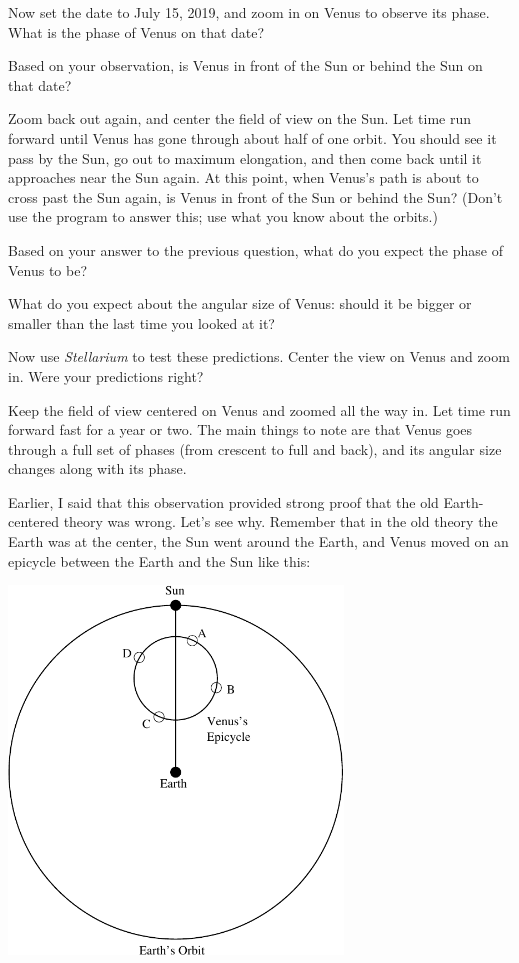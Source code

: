 \answerspace{ 0.7in}

\pagebreak[2]
Now set the date to July 15, 2019, and 
zoom in on Venus to observe its phase.  What is the phase of Venus on that date?

\answerspace{ 0.7in}

Based on your observation, is Venus in front of the Sun or behind the Sun
on that date?

\answerspace{ 0.7in}


Zoom back out again, and center the field of view on the Sun.  Let time
run forward until Venus has gone through about half of one orbit.  You
should see it pass by the Sun, go out to maximum elongation, and then come
back until it approaches near the Sun again.  At this point, when
Venus's path is about to cross past the Sun again, is Venus in front
of the Sun or behind the Sun?  (Don't use the program to answer this; 
use what you know about the orbits.)

\answerspace{ 0.7in}

Based on your answer to the previous question, what do you expect the 
phase of Venus to be?

\answerspace{ 0.7in}

What do you expect about the angular size of Venus: should it be bigger
or smaller than the last time you looked at it?

\answerspace{ 0.7in}

Now use \textit{Stellarium} to
test these predictions.
Center the view on Venus and zoom in.
Were your predictions right?

\answerspace{ 0.7in}

\pagebreak[2]
Keep the field of view centered on Venus and zoomed all the way in.  Let time
run forward fast for a year or two.  The main things to note are that
Venus goes through a full set of phases (from crescent to full and back),
and its angular size changes along with its phase.

Earlier, I said that this observation provided strong proof that
the old Earth-centered theory was wrong.  Let's see why.  Remember that
in the old theory the Earth was at the center, the Sun went around the
Earth, and Venus moved on an epicycle between the Earth and the Sun like this:


\centerline{\includegraphics[width=3.5in]{phasesofvenus/venus2.pdf}}


